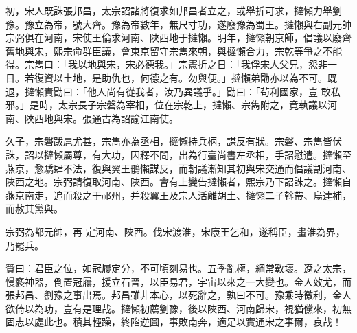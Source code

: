 \begin{pinyinscope}
 初，宋人既誅張邦昌，太宗詔諸將復求如邦昌者立之，或舉折可求，撻懶力舉劉豫。豫立為帝，號大齊。豫為帝數年，無尺寸功，遂廢豫為蜀王。撻懶與右副元帥宗弼俱在河南，宋使王倫求河南、陜西地于撻懶。明年，撻懶朝京師，倡議以廢齊舊地與宋，熙宗命群臣議，會東京留守宗雋來朝，與撻懶合力，宗乾等爭之不能得。宗雋曰：「我以地與宋，宋必德我。」宗憲折之日：「我俘宋人父兄，怨非一日。若復資以土地，是助仇也，何德之有。勿與便。」撻懶弟勖亦以為不可。既退，撻懶責勖曰：「他人尚有從我者，汝乃異議乎。」勖曰：「茍利國家，豈
 敢私邪。」是時，太宗長子宗磐為宰相，位在宗乾上，撻懶、宗雋附之，竟執議以河南、陜西地與宋。張通古為詔諭江南使。



 久子，宗磐跋扈尤甚，宗雋亦為丞相，撻懶持兵柄，謀反有狀。宗磐、宗雋皆伏誅，詔以撻懶屬尊，有大功，因釋不問，出為行臺尚書左丞相，手詔慰遣。撻懶至燕京，愈驕肆不法，復與翼王鶻懶謀反，而朝議漸知其初與宋交通而倡議割河南、陜西之地。宗弼請復取河南、陜西。會有上變告撻懶者，熙宗乃下詔誅之。撻懶自燕京南走，追而殺之于祁州，并殺翼王及宗人活離胡土、撻懶二子斡帶、烏達補，而赦其黨與。



 宗弼為都元帥，再
 定河南、陜西。伐宋渡淮，宋康王乞和，遂稱臣，畫淮為界，乃罷兵。



 贊曰：君臣之位，如冠屨定分，不可頃刻易也。五季亂極，綱常斁壞。遼之太宗，慢褻神器，倒置冠屨，援立石晉，以臣易君，宇宙以來之一大變也。金人效尤，而張邦昌、劉豫之事出焉。邦昌雖非本心，以死辭之，孰曰不可。豫乘時徼利，金人欲倚以為功，豈有是理哉。撻懶初薦劉豫，後以陜西、河南歸宋，視猶儻來，初無固志以處此也。積其輕躁，終陷逆圖，事敗南奔，適足以實通宋之事爾，哀哉！



\end{pinyinscope}